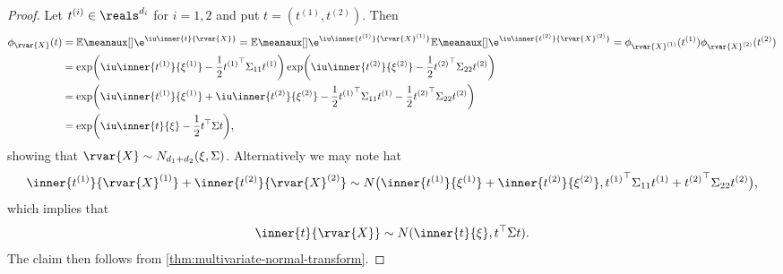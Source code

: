 \documentclass[article, a4paper, 11pt, oneside]{memoir}
\numberwithin{equation}{chapter}
\newcommand{\calE}{\mathcal{E}}
\newcommand{\calF}{\mathcal{F}}
\newcommand{\calG}{\mathcal{G}}
\begin{document}
\begin{proof}
    Let $t^{(i)} \in \reals^{d_i}$ for $i = 1,2$ and put $t = (t^{(1)}, t^{(2)})$. Then
    \begin{align*}
        \phi_{\rvar{X}}(t)
            &= \mean{\e^{\iu \inner{t}{\rvar{X}}}}
             = \mean{\e^{\iu \inner{t^{(1)}}{\rvar{X}^{(1)}}}} \mean{\e^{\iu \inner{t^{(2)}}{\rvar{X}^{(2)}}}}
             = \phi_{\rvar{X}^{(1)}}(t^{(1)}) \phi_{\rvar{X}^{(2)}}(t^{(2)}) \\
            &= \exp \biggl( \iu \inner{t^{(1)}}{\xi^{(1)}} - \frac{1}{2} {t^{(1)}}\trans \Sigma_{11} t^{(1)} \biggr)
            \exp \biggl( \iu \inner{t^{(2)}}{\xi^{(2)}} - \frac{1}{2} {t^{(2)}}\trans \Sigma_{22} t^{(2)} \biggr) \\
            &= \exp \biggl( \iu \inner{t^{(1)}}{\xi^{(1)}} + \iu \inner{t^{(2)}}{\xi^{(2)}} - \frac{1}{2} {t^{(1)}}\trans \Sigma_{11} t^{(1)} - \frac{1}{2} {t^{(2)}}\trans \Sigma_{22} t^{(2)} \biggr) \\
            &= \exp \biggl( \iu \inner{t}{\xi} - \frac{1}{2} t\trans \Sigma t \biggr),
    \end{align*}
    showing that $\rvar{X} \sim N_{d_1+d_2}(\xi,\Sigma)$. Alternatively we may note hat
    \begin{equation*}
        \inner{t^{(1)}}{\rvar{X}^{(1)}} + \inner{t^{(2)}}{\rvar{X}^{(2)}}
            \sim N \bigl( \inner{t^{(1)}}{\xi^{(1)}} + \inner{t^{(2)}}{\xi^{(2)}}, {t^{(1)}}\trans \Sigma_{11}t^{(1)} + {t^{(2)}}\trans \Sigma_{22}t^{(2)} \bigr),
    \end{equation*}
    which implies that
    \begin{equation*}
        \inner{t}{\rvar{X}}
            \sim N(\inner{t}{\xi}, t\trans \Sigma t).
    \end{equation*}
    The claim then follows from \cref{thm:multivariate-normal-transform}.
\end{proof}


\newcommand{\frakX}{\mathfrak{X}}
\newcommand{\frakY}{\mathfrak{Y}}


\end{document}
